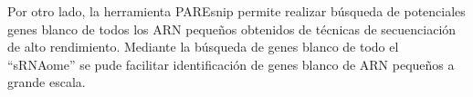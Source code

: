 Por otro lado, la herramienta PAREsnip permite realizar búsqueda de potenciales genes blanco de todos los ARN pequeños obtenidos de técnicas de secuenciación de alto rendimiento.
Mediante la búsqueda de genes blanco de todo el ``sRNAome'' se pude facilitar identificación de genes blanco de ARN pequeños a grande escala.

